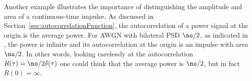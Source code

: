 Another example illustrates the importance of distinguishing the amplitude and area of a continuous-time impulse. As discussed in Section~\ref{sec:autocorrelationFunction}, the autocorrelation of a power signal at the origin is the average power. For AWGN with bilateral PSD $\no / 2$, as indicated in , the power is infinite and its autocorrelation at the origin is an impulse with area $\no / 2$. In other words, looking carelessly at the autocorrelation $R(\tau)=\no/2 \delta(\tau)$ one could think that the average power is $\no / 2$, but in fact $R(0)=\infty$.
